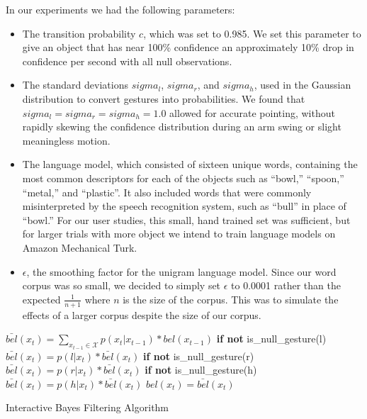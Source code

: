 \documentclass[a4paper, 11pt]{article} %
\begin{document}
In our experiments we had the following parameters:\begin{itemize}
\item The transition probability $c$, which was set to 0.985. We set this parameter to give an object that has near 100\% confidence an approximately 10\% drop in confidence per second with all null observations.
\item The standard deviations $sigma_l$, $sigma_r$, and $sigma_h$, used in the Gaussian distribution to convert gestures into probabilities. We found that $sigma_l = sigma_r = sigma_h = 1.0$ allowed for accurate pointing, without rapidly skewing the confidence distribution during an arm swing or slight meaningless motion.
\item The language model, which consisted of sixteen unique words, containing the most common descriptors for each of the objects such as ``bowl,'' ``spoon,'' ``metal,'' and ``plastic''. It also included words that were commonly misinterpreted by the speech recognition system, such as ``bull'' in place of ``bowl.'' For our user studies, this small, hand trained set was sufficient, but for larger trials with more object we intend to train language models on Amazon Mechanical Turk.
\item $\epsilon$, the smoothing factor for the unigram language model. Since our word corpus was so small, we decided to simply set $\epsilon$ to 0.0001 rather than the expected $\frac{1}{n+1}$ where $n$ is the size of the corpus. This was to simulate the effects of a larger corpus despite the size of our corpus.
\end{itemize}
\begin{algorithm}
    \DontPrintSemicolon
    \BlankLine
    \BlankLine
     {
      $\bar{bel}(x_t) = \displaystyle\sum_{x_{t-1} \in \mathcal{X}} p(x_t|x_{t-1})*bel(x_{t-1})$
      \BlankLine
      \textbf{if not} is\_null\_gesture(l)
      \BlankLine
      \Indp$\bar{bel}(x_t) = p(l | x_t) *  \bar{bel}(x_t)$
      \BlankLine
      \Indm\textbf{if not} is\_null\_gesture(r)
      \BlankLine
      \Indp$\bar{bel}(x_t) = p(r | x_t) *  \bar{bel}(x_t)$
      \BlankLine
      \Indm\textbf{if not} is\_null\_gesture(h)
      \BlankLine
      \Indp$\bar{bel}(x_t) = p(h | x_t) *  \bar{bel}(x_t)$
      \BlankLine
      \Indm{}
      $bel(x_t) = \bar{bel}(x_t)$
    }
    \BlankLine
\caption{Interactive Bayes Filtering Algorithm} 
\label{alg:algorithm}
\end{algorithm}
\end{document}
